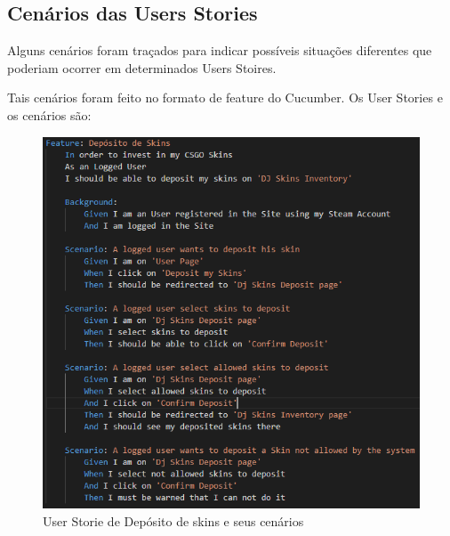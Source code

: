 \documentclass[
    12pt,               %
    openright,          %
    oneside,
    a4paper,            %
    MODELO,             %
    TODO,               %
    english,            %
    brazil              %
    ]{ifsp-spo-inf-ctds} %
\begin{document}
\begin{apendicesenv}

	\partapendices

	\chapter{Cenários das Users Stories}
	\label{cenarios}
	Alguns cenários foram traçados para indicar possíveis situações diferentes que poderiam ocorrer em determinados Users Stoires. 
	
	Tais cenários foram feito no formato de feature do Cucumber. Os User Stories e os cenários são:
	
	\begin{figure}[!htb]
		\centering
		\includegraphics[scale=0.9]{Imagens/DepositoSkins.png}
		\caption{User Storie de Depósito de skins e seus cenários}
	\end{figure}
	

\end{apendicesenv}
\end{document}
